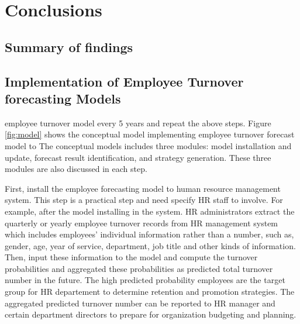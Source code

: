 \chapter{Conclusions} \label{ch:conclusion}
\section{Summary of findings}
\section{Implementation of Employee Turnover forecasting Models}

 employee turnover model every 5 years and repeat the above steps. Figure \ref{fig:model} shows the conceptual model implementing employee turnover forecast model to  The conceptual models includes three modules: model installation and update, forecast result identification, and strategy generation. These three modules are also discussed in each step. 
 
First, install the employee forecasting model to human resource management system. This step is a practical step and need specify HR staff to involve. For example, after the model installing in the system. HR administrators extract the quarterly or yearly employee turnover records from HR management system which includes employees' individual information rather than a number, such as, gender, age, year of service, department, job title and other kinds of information. Then, input these information to the model and compute the turnover probabilities and aggregated these probabilities as predicted total turnover number in the future. The high predicted probability employees are the target group for HR departement to determine retention and promotion strategies. The aggregated predicted turnover number can be reported to HR manager and certain department directors to prepare for organization budgeting and planning. 

